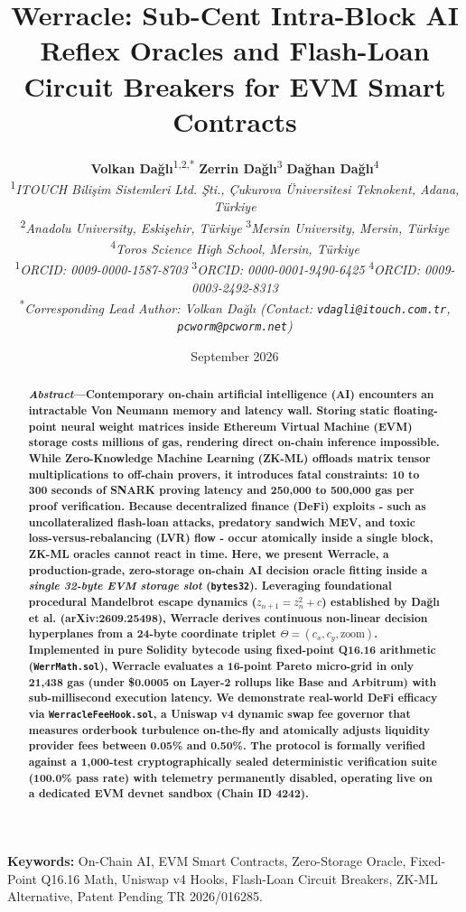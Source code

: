 \documentclass[10pt,twocolumn]{article}
\title{\textbf{\Large Werracle: Sub-Cent Intra-Block AI Reflex Oracles and Flash-Loan Circuit Breakers for EVM Smart Contracts}}
\author{
    \textbf{Volkan Dağlı}\textsuperscript{1,2,*} \quad \textbf{Zerrin Dağlı}\textsuperscript{3} \quad \textbf{Dağhan Dağlı}\textsuperscript{4} \\
    \textsuperscript{1}\textit{ITOUCH Bilişim Sistemleri Ltd. Şti., Çukurova Üniversitesi Teknokent, Adana, Türkiye} \\
    \textsuperscript{2}\textit{Anadolu University, Eskişehir, Türkiye} \quad \textsuperscript{3}\textit{Mersin University, Mersin, Türkiye} \\
    \textsuperscript{4}\textit{Toros Science High School, Mersin, Türkiye} \\
    \textsuperscript{1}\textit{ORCID: 0009-0000-1587-8703} \quad \textsuperscript{3}\textit{ORCID: 0000-0001-9490-6425} \quad \textsuperscript{4}\textit{ORCID: 0009-0003-2492-8313} \\
    \textsuperscript{*}\textit{Corresponding Lead Author: Volkan Dağlı (Contact: \texttt{vdagli@itouch.com.tr}, \texttt{pcworm@pcworm.net})}
}
\date{September 2026}
\begin{document}
\maketitle

\begin{abstract}
\textbf{\textit{Abstract}---Contemporary on-chain artificial intelligence (AI) encounters an intractable Von Neumann memory and latency wall. Storing static floating-point neural weight matrices inside Ethereum Virtual Machine (EVM) storage costs millions of gas, rendering direct on-chain inference impossible. While Zero-Knowledge Machine Learning (ZK-ML) offloads matrix tensor multiplications to off-chain provers, it introduces fatal constraints: 10 to 300 seconds of SNARK proving latency and 250,000 to 500,000 gas per proof verification. Because decentralized finance (DeFi) exploits - such as uncollateralized flash-loan attacks, predatory sandwich MEV, and toxic loss-versus-rebalancing (LVR) flow - occur atomically inside a single block, ZK-ML oracles cannot react in time. Here, we present \textbf{Werracle}, a production-grade, zero-storage on-chain AI decision oracle fitting inside a \textit{single 32-byte EVM storage slot} (\texttt{bytes32}). Leveraging foundational procedural Mandelbrot escape dynamics ($z_{n+1} = z_n^2 + c$) established by Da\u{g}l\i{} et al. (arXiv:2609.25498), Werracle derives continuous non-linear decision hyperplanes from a 24-byte coordinate triplet $\Theta = (c_x, c_y, \text{zoom})$. Implemented in pure Solidity bytecode using fixed-point Q16.16 arithmetic (\texttt{WerrMath.sol}), Werracle evaluates a 16-point Pareto micro-grid in only \textbf{21,438 gas} (under \$0.0005 on Layer-2 rollups like Base and Arbitrum) with sub-millisecond execution latency. We demonstrate real-world DeFi efficacy via \texttt{WerracleFeeHook.sol}, a Uniswap v4 dynamic swap fee governor that measures orderbook turbulence on-the-fly and atomically adjusts liquidity provider fees between 0.05\% and 0.50\%. The protocol is formally verified against a 1,000-test cryptographically sealed deterministic verification suite (100.0\% pass rate) with telemetry permanently disabled, operating live on a dedicated EVM devnet sandbox (Chain ID 4242).}
\end{abstract}

\vspace{0.2cm}
\noindent\textbf{Keywords:} On-Chain AI, EVM Smart Contracts, Zero-Storage Oracle, Fixed-Point Q16.16 Math, Uniswap v4 Hooks, Flash-Loan Circuit Breakers, ZK-ML Alternative, Patent Pending TR 2026/016285.
\end{document}
